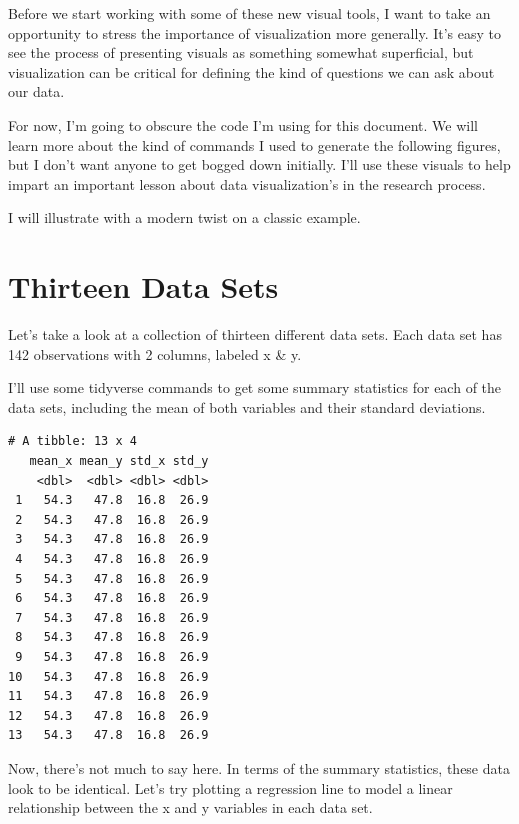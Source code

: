 \documentclass[
  letterpaper,
  DIV=11,
  numbers=noendperiod]{scrreprt}
\begin{document}

Before we start working with some of these new visual tools, I want to
take an opportunity to stress the importance of visualization more
generally. It's easy to see the process of presenting visuals as
something somewhat superficial, but visualization can be critical for
defining the kind of questions we can ask about our data.

For now, I'm going to obscure the code I'm using for this document. We
will learn more about the kind of commands I used to generate the
following figures, but I don't want anyone to get bogged down initially.
I'll use these visuals to help impart an important lesson about data
visualization's in the research process.

I will illustrate with a modern twist on a classic example.

\section*{Thirteen Data Sets}\label{thirteen-data-sets}


Let's take a look at a collection of thirteen different data sets. Each
data set has 142 observations with 2 columns, labeled x \& y.

I'll use some tidyverse commands to get some summary statistics for each
of the data sets, including the mean of both variables and their
standard deviations.

\begin{verbatim}
# A tibble: 13 x 4
   mean_x mean_y std_x std_y
    <dbl>  <dbl> <dbl> <dbl>
 1   54.3   47.8  16.8  26.9
 2   54.3   47.8  16.8  26.9
 3   54.3   47.8  16.8  26.9
 4   54.3   47.8  16.8  26.9
 5   54.3   47.8  16.8  26.9
 6   54.3   47.8  16.8  26.9
 7   54.3   47.8  16.8  26.9
 8   54.3   47.8  16.8  26.9
 9   54.3   47.8  16.8  26.9
10   54.3   47.8  16.8  26.9
11   54.3   47.8  16.8  26.9
12   54.3   47.8  16.8  26.9
13   54.3   47.8  16.8  26.9
\end{verbatim}

Now, there's not much to say here. In terms of the summary statistics,
these data look to be identical. Let's try plotting a regression line to
model a linear relationship between the x and y variables in each data
set.
\end{document}
